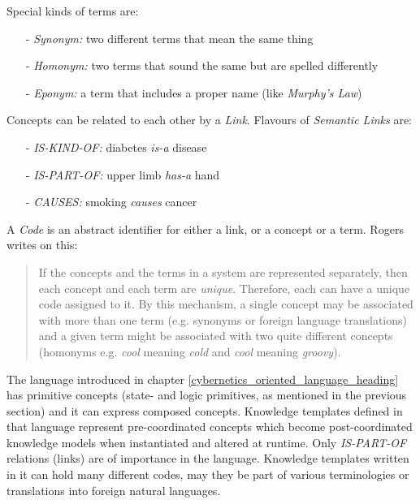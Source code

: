 Special kinds of terms are:

\begin{itemize}
    \item[-] \emph{Synonym:} two different terms that mean the same thing
    \item[-] \emph{Homonym:} two terms that sound the same but are spelled differently
    \item[-] \emph{Eponym:} a term that includes a proper name (like \emph{Murphy's Law})
\end{itemize}

Concepts can be related to each other by a \emph{Link}. Flavours of
\emph{Semantic Links} are:

\begin{itemize}
    \item[-] \emph{IS-KIND-OF:} diabetes \emph{is-a} disease
    \item[-] \emph{IS-PART-OF:} upper limb \emph{has-a} hand
    \item[-] \emph{CAUSES:} smoking \emph{causes} cancer
\end{itemize}

A \emph{Code} is an abstract identifier for either a link, or a concept or a
term. Rogers \cite{rogers} writes on this:

\begin{quote}
    If the concepts and the terms in a system are represented separately, then
    each concept and each term are \emph{unique}. Therefore, each can have a
    unique code assigned to it. By this mechanism, a single concept may be
    associated with more than one term (e.g. synonyms or foreign language
    translations) and a given term might be associated with two quite different
    concepts (homonyms e.g. \emph{cool} meaning \emph{cold} and \emph{cool}
    meaning \emph{groovy}).
\end{quote}

The language introduced in chapter \ref{cybernetics_oriented_language_heading}
has primitive concepts (state- and logic primitives, as mentioned in the
previous section) and it can express composed concepts. Knowledge templates
defined in that language represent pre-coordinated concepts which become
post-coordinated knowledge models when instantiated and altered at runtime.
Only \emph{IS-PART-OF} relations (links) are of importance in the language.
Knowledge templates written in it can hold many different codes, may they be
part of various terminologies or translations into foreign natural languages.
